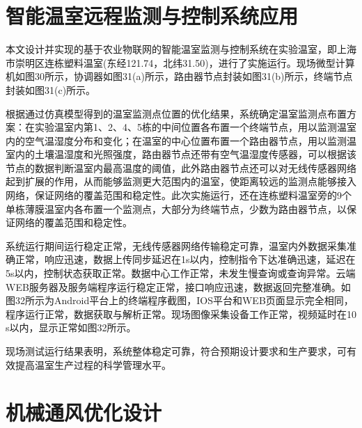 \section{智能温室远程监测与控制系统应用}
本文设计并实现的基于农业物联网的智能温室监测与控制系统在实验温室，即上海市崇明区连栋塑料温室(东经121.74，北纬31.50)，进行了实施运行。现场微型计算机如图30所示，协调器如图31(a)所示，路由器节点封装如图31(b)所示，终端节点封装如图31(c)所示。
\begin{figure}[!htp]
\end{figure}
根据通过仿真模型得到的温室监测点位置的优化结果，系统确定温室监测点布置方案：在实验温室内第1、2、4、5栋的中间位置各布置一个终端节点，用以监测温室内的空气温湿度分布和变化；在温室的中心位置布置一个路由器节点，用以监测温室内的土壤温湿度和光照强度，路由器节点还带有空气温湿度传感器，可以根据该节点的数据判断温室内最高温度的阈值，此外路由器节点还可以对无线传感器网络起到扩展的作用，从而能够监测更大范围内的温室，使距离较远的监测点能够接入网络，保证网络的覆盖范围和稳定性。此次实施运行，还在连栋塑料温室旁的9个单栋薄膜温室内各布置一个监测点，大部分为终端节点，少数为路由器节点，以保证网络的覆盖范围和稳定性。

系统运行期间运行稳定正常，无线传感器网络传输稳定可靠，温室内外数据采集准确正常，响应迅速，数据上传同步延迟在1s以内，控制指令下达准确迅速，延迟在5s以内，控制状态获取正常。数据中心工作正常，未发生慢查询或查询异常。云端WEB服务器及服务端程序运行稳定正常，接口响应迅速，数据返回完整准确。如图32所示为Android平台上的终端程序截图，IOS平台和WEB页面显示完全相同，程序运行正常，数据获取与解析正常。现场图像采集设备工作正常，视频延时在10 s以内，显示正常如图32所示。

现场测试运行结果表明，系统整体稳定可靠，符合预期设计要求和生产要求，可有效提高温室生产过程的科学管理水平。

\section{机械通风优化设计}
